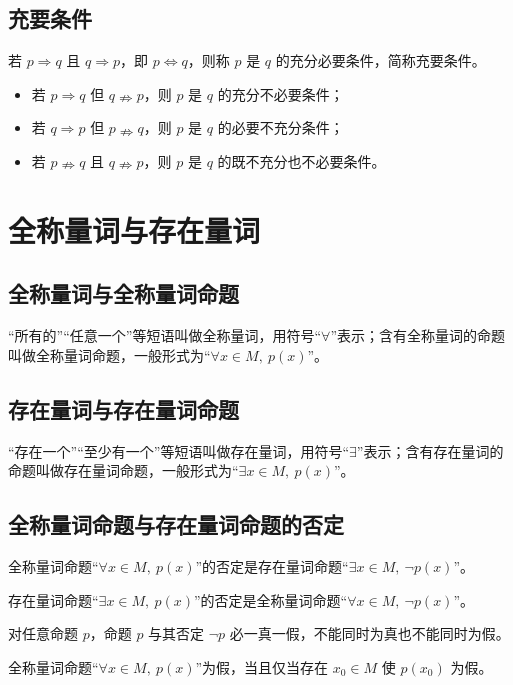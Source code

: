 \subsection{充要条件}
\begin{definition}[充要条件]
若 $p \Rightarrow q$ 且 $q \Rightarrow p$，即 $p \Leftrightarrow q$，则称 $p$ 是 $q$ 的充分必要条件，简称充要条件。
\end{definition}
\begin{definition}
\begin{itemize}
    \item 若 $p \Rightarrow q$ 但 $q \nRightarrow p$，则 $p$ 是 $q$ 的充分不必要条件；
    \item 若 $q \Rightarrow p$ 但 $p \nRightarrow q$，则 $p$ 是 $q$ 的必要不充分条件；
    \item 若 $p \nRightarrow q$ 且 $q \nRightarrow p$，则 $p$ 是 $q$ 的既不充分也不必要条件。
\end{itemize}
\end{definition}

\section{全称量词与存在量词}
\subsection{全称量词与全称量词命题}
\begin{definition}[全称量词与全称量词命题]
“所有的”“任意一个”等短语叫做全称量词，用符号“$\forall$”表示；含有全称量词的命题叫做全称量词命题，一般形式为“$\forall x \in M,\ p(x)$”。
\end{definition}
\subsection{存在量词与存在量词命题}
\begin{definition}[存在量词与存在量词命题]
“存在一个”“至少有一个”等短语叫做存在量词，用符号“$\exists$”表示；含有存在量词的命题叫做存在量词命题，一般形式为“$\exists x \in M,\ p(x)$”。
\end{definition}
\subsection{全称量词命题与存在量词命题的否定}
\begin{definition}[全称量词命题的否定]
全称量词命题“$\forall x \in M,\ p(x)$”的否定是存在量词命题“$\exists x \in M,\ \neg p(x)$”。
\end{definition}
\begin{definition}[存在量词命题的否定]
存在量词命题“$\exists x \in M,\ p(x)$”的否定是全称量词命题“$\forall x \in M,\ \neg p(x)$”。
\end{definition}
\begin{theorem}[命题与其否定]
对任意命题 $p$，命题 $p$ 与其否定 $\neg p$ 必一真一假，不能同时为真也不能同时为假。
\end{theorem}
\begin{corollary}[全称量词命题为假的判定]
全称量词命题“$\forall x \in M,\ p(x)$”为假，当且仅当存在 $x_0 \in M$ 使 $p(x_0)$ 为假。
\end{corollary}
